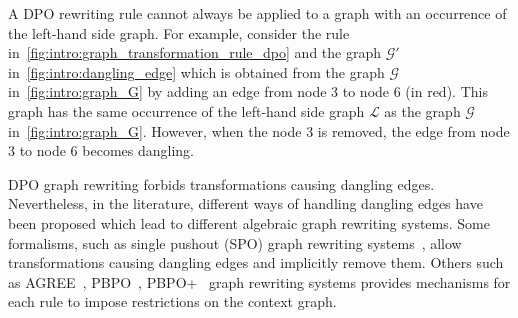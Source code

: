 A DPO rewriting rule cannot always be applied to a graph with an occurrence of the left-hand side graph.
For example, consider the rule in~\autoref{fig:intro:graph_transformation_rule_dpo} and the graph $\mathcal{G}'$ in~\autoref{fig:intro:dangling_edge} which is obtained from the graph $\mathcal{G}$ in~\autoref{fig:intro:graph_G} by adding an edge from node 3 to node 6 (in red). This graph has the same occurrence of the left-hand side graph $\mathcal{L}$ as the graph $\mathcal{G}$ in~\autoref{fig:intro:graph_G}. However, when the node 3 is removed, the edge from node 3 to node 6 becomes dangling.

\begin{figure}[!htbp]
   \centering
  \caption{}
  \label{fig:intro:dangling_edge}
\end{figure}
DPO graph rewriting forbids transformations causing dangling edges. Nevertheless,
in the literature, different ways of handling dangling edges have been proposed which 
lead to different algebraic graph rewriting systems.
  Some formalisms, such as single pushout (SPO) graph rewriting systems~\cite{ehrig1997algebraic}, allow transformations causing dangling edges and implicitly remove them. Others such as AGREE~\cite{corradini2015agree}, PBPO~\cite{corradini2019thepbpo}, PBPO+~\cite{overbeek2023graph} graph rewriting systems provides mechanisms for each rule to impose restrictions on the context graph.

